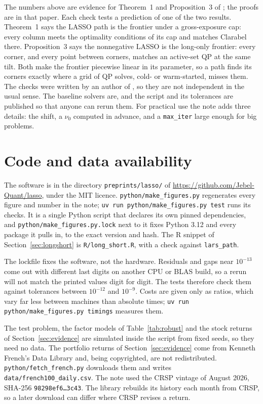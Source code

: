 \documentclass[11pt]{article}
\begin{document}
The numbers above are evidence for Theorem~1 and Proposition~3 of \cite{perspective};
the proofs are in that paper. Each check tests a prediction of one of the two results.
Theorem~1 says the LASSO path is the frontier under a gross-exposure cap: every column
meets the optimality conditions of its cap and matches Clarabel there. Proposition~3
says the nonnegative LASSO is the long-only frontier: every corner, and every point
between corners, matches an active-set QP at the same tilt. Both make the frontier
piecewise linear in its parameter, so a path finds its corners exactly where a grid of QP
solves, cold- or warm-started, misses them. The checks were written by an author of
\cite{perspective}, so they are not independent in the usual sense. The baseline solvers
are, and the script and its tolerances are published so that anyone can rerun them.
For practical use the note adds three details: the shift, a $\nu_0$ computed in
advance, and a \texttt{max\_iter} large enough for big problems.

\section*{Code and data availability}
\label{sec:availability}

The software is in the directory \texttt{preprints/lasso/} of
\url{https://github.com/Jebel-Quant/lasso}, under the MIT licence.
\texttt{python/make\_figures.py} regenerates every
figure and number in the note; \texttt{uv run python/make\_figures.py test} runs its checks. It
is a single Python script that declares its own pinned dependencies, and
\texttt{python/make\_figures.py.lock} next to it fixes Python 3.12 and every package it
pulls in, to the exact version and hash. The R snippet of
Section~\ref{sec:longshort} is \texttt{R/long\_short.R}, with a check against
\texttt{lars\_path}.

The lockfile fixes the software, not the hardware. Residuals and gaps near $10^{-13}$ come
out with different last digits on another CPU or BLAS build, so a rerun will not match
the printed values digit for digit. The tests therefore check them against tolerances
between $10^{-12}$ and $10^{-9}$.
Costs are given only as ratios, which vary far less between
machines than absolute times; \texttt{uv run python/make\_figures.py timings} measures them.

The test problem, the factor models of Table~\ref{tab:robust} and the stock returns of
Section~\ref{sec:evidence} are simulated inside the script from fixed seeds, so they need
no data. The portfolio returns of
Section~\ref{sec:evidence} come from Kenneth French's Data Library \cite{french} and,
being copyrighted, are not redistributed. \texttt{python/fetch\_french.py} downloads them
and writes \texttt{data/french100\_daily.csv}. The note used the CRSP vintage of August
2026, SHA-256 \texttt{98298ef6\ldots3c43}. The library rebuilds its history each month from
CRSP, so a later download can differ where CRSP revises a return.
\end{document}
